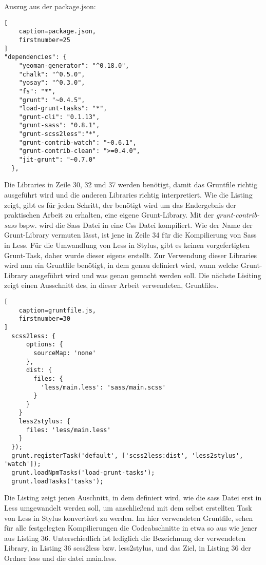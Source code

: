 Auszug aus der package.json:
\begin{lstlisting}[
	caption=package.json,
	firstnumber=25
]
"dependencies": {
    "yeoman-generator": "^0.18.0",
    "chalk": "^0.5.0",
    "yosay": "^0.3.0",
    "fs": "*",
    "grunt": "~0.4.5",
    "load-grunt-tasks": "*",
    "grunt-cli": "0.1.13",
    "grunt-sass": "0.8.1",
    "grunt-scss2less":"*",
    "grunt-contrib-watch": "~0.6.1",
    "grunt-contrib-clean": ">=0.4.0",
    "jit-grunt": "~0.7.0"
  },
\end{lstlisting}
Die Libraries in Zeile 30, 32 und 37 werden benötigt, damit das Gruntfile richtig ausgeführt wird und die anderen Libraries richtig interpretiert.
Wie die Listing zeigt, gibt es für jeden Schritt, der benötigt wird um das Endergebnis der praktischen Arbeit zu erhalten, eine eigene Grunt-Library. Mit der \textit{grunt-contrib-sass} bspw. wird die Sass Datei in eine Css Datei kompiliert. \newline
Wie der Name der Grunt-Library vermuten lässt, ist jene in Zeile 34 für die Kompilierung von Sass in Less. Für die Umwandlung von Less in Stylus, gibt es keinen vorgefertigten Grunt-Task, daher wurde dieser eigens erstellt.\newline
Zur Verwendung dieser Libraries wird nun ein Gruntfile benötigt, in dem genau definiert wird, wann welche Grunt-Library ausgeführt wird und was genau gemacht werden soll. Die nächste Lisiting zeigt einen Ausschnitt des, in dieser Arbeit verwendeten, Gruntfiles.
\begin{lstlisting}[
	caption=gruntfile.js,
	firstnumber=30
]
  scss2less: {
      options: {
        sourceMap: 'none'
      },
      dist: {
        files: {
          'less/main.less': 'sass/main.scss'
        }
      }
    }
    less2stylus: {
      files: 'less/main.less'
    }
  });
  grunt.registerTask('default', ['scss2less:dist', 'less2stylus', 'watch']);
  grunt.loadNpmTasks('load-grunt-tasks');
  grunt.loadTasks('tasks');
\end{lstlisting}
Die Listing zeigt jenen Auschnitt, in dem definiert wird, wie die sass Datei erst in Less umgewandelt werden soll, um anschließend mit dem selbst erstellten Task von Less in Stylus konvertiert zu werden.\newline
Im hier verwendeten Gruntfile, sehen für alle festgelegten Kompilierungen die Codeabschnitte in etwa so aus wie jener aus Listing 36. Unterschiedlich ist lediglich die Bezeichnung der verwendeten Library, in Listing 36 scss2less bzw. less2stylus, und das Ziel, in Listing 36 der Ordner less und die datei main.less.\newline
